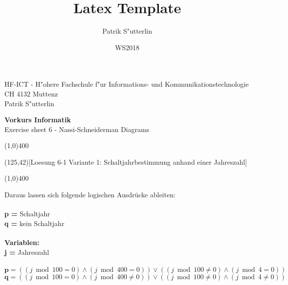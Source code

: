 \documentclass[a4paper,10pt]{article}
\title{Latex Template}
\author{Patrik S"utterlin}
\date{WS2018}
\begin{document}
HF-ICT - H"ohere Fachschule f"ur Informations- und Kommunikationstechnologie\\
CH 4132 Muttenz\\
Patrik S"utterlin

\vspace{2mm}

\begin{center}
{\Large \bf Vorkurs Informatik}\\
Exercise sheet 6 - Nassi-Schneiderman Diagrams
\end{center}

\vspace{2mm}
\line(1,0){400}
\vspace{5mm}


\begin{center}
\begin{struktogramm}(125,42)[Loesung 6-1 Variante 1: Schaltjahrbestimmung anhand einer Jahreszahl]
    \change
    \ifend
  \change
    \change
    \ifend
  \ifend
\end{struktogramm}
\end{center}
\line(1,0){400}
\vspace{4mm}

Daraus lassen sich folgende logischen Ausdr\"ucke ableiten:\\ \\
\textbf{p =} Schaltjahr \\
\textbf{q =} kein Schaltjahr \\
\\
\textbf{Variablen:} \\
\textbf{j =} Jahreszahl \\
\\
$\mathbf{p} = ((j \bmod{100} = 0) \land (j \bmod{400} = 0)) \lor ((j \bmod{100} \neq 0) \land (j \bmod 4 = 0))$ \\
$\mathbf{q} = ((j \bmod{100} = 0) \land (j \bmod{400} \neq 0)) \lor ((j \bmod{100} \neq 0) \land (j \bmod 4 \neq 0))$ 
\end{document}
